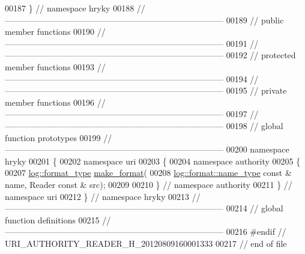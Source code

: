 \begin{DoxyCode}
00187 \} \textcolor{comment}{// namespace hryky}
00188 \textcolor{comment}{//
      ------------------------------------------------------------------------------}
00189 \textcolor{comment}{// public member functions}
00190 \textcolor{comment}{//
      ------------------------------------------------------------------------------}
00191 \textcolor{comment}{//
      ------------------------------------------------------------------------------}
00192 \textcolor{comment}{// protected member functions}
00193 \textcolor{comment}{//
      ------------------------------------------------------------------------------}
00194 \textcolor{comment}{//
      ------------------------------------------------------------------------------}
00195 \textcolor{comment}{// private member functions}
00196 \textcolor{comment}{//
      ------------------------------------------------------------------------------}
00197 \textcolor{comment}{//
      ------------------------------------------------------------------------------}
00198 \textcolor{comment}{// global function prototypes}
00199 \textcolor{comment}{//
      ------------------------------------------------------------------------------}
00200 \textcolor{keyword}{namespace }hryky
00201 \{
00202 \textcolor{keyword}{namespace }uri
00203 \{
00204 \textcolor{keyword}{namespace }authority
00205 \{
00207     \hyperlink{namespacehryky_1_1log_ad50448c3f934f1eacd5c1bcffe8111e1}{log::format_type} \hyperlink{namespacehryky_1_1uri_a4c47d905f62ff90b7026c9f3f6544a9b}{make_format}(
00208         \hyperlink{namespacehryky_1_1log_1_1format_ab7408d1e2ed2d648dbf9bba69eb74288}{log::format::name_type} \textcolor{keyword}{const} & name, Reader \textcolor{keyword}{const} & src);
00209 
00210 \} \textcolor{comment}{// namespace authority}
00211 \} \textcolor{comment}{// namespace uri}
00212 \} \textcolor{comment}{// namespace hryky}
00213 \textcolor{comment}{//
      ------------------------------------------------------------------------------}
00214 \textcolor{comment}{// global function definitions}
00215 \textcolor{comment}{//
      ------------------------------------------------------------------------------}
00216 \textcolor{preprocessor}{#endif // URI\_AUTHORITY\_READER\_H\_20120809160001333}
00217 \textcolor{preprocessor}{}\textcolor{comment}{// end of file}
\end{DoxyCode}
